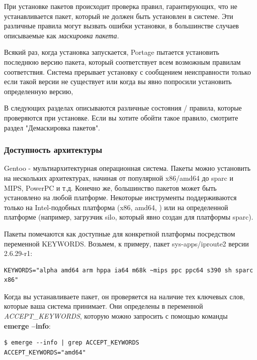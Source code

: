 \documentclass[10pt]{book}
\begin{document}
При установке пакетов происходит проверка правил, гарантирующих, что не устанавливается пакет, который не должен быть установлен в системе. Эти различные правила могут вызвать ошибки установки, в большинстве случаев описываемые как \textit{маскировка пакета}.

Всякий раз, когда установка запускается, Portage пытается установить последнюю версию пакета, который соответствует всем возможным правилам соответствия.  Система прерывает установку с сообщением неисправности только если такой версии не существует или когда вы явно попросили установить определенную версию,

В следующих разделах описываются различные состояния / правила, которые проверяются при установке. Если вы хотите обойти такое правило, смотрите раздел "Демаскировка пакетов".

\subsubsection{Доступность архитектуры}
Gentoo - мультиархитектурная операционная система. Пакеты  можно установить на нескольких архитектурах, начиная от популярной x86/amd64 до sparc и MIPS, PowerPC и т.д. Конечно же, большинство пакетов может быть установлено на любой платформе. Некоторые инструменты поддерживаются только на Intel-подобных платформа (x86, amd64, ) или на определенной платформе (например, загрузчик silo, который явно создан для платформы sparc).

Пакеты помечаются как доступные для конкретной платформы посредством переменной KEYWORDS. Возьмем, к примеру, пакет sys-apps/iproute2 версии 2.6.29-r1:
\begin{tcolorbox}
\begin{lstlisting}
KEYWORDS="alpha amd64 arm hppa ia64 m68k ~mips ppc ppc64 s390 sh sparc x86"
\end{lstlisting}
\end{tcolorbox}

Когда вы устанавливаете пакет, он проверяется на наличие тех ключевых слов, которые ваша система принимает. Они определены в переменной \textit{ACCEPT\_KEYWORDS}, которую можно запросить с помощью команды \textbf{emerge --info}:

\begin{tcolorbox}
\begin{lstlisting}
$ emerge --info | grep ACCEPT_KEYWORDS
ACCEPT_KEYWORDS="amd64"
\end{lstlisting}
\end{tcolorbox}
\end{document}
